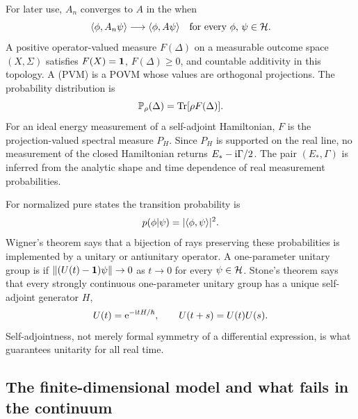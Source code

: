 For later use, $A_n$ converges to $A$ in the 
when
\begin{equation}
  \langle \phi,A_n\psi\rangle\longrightarrow
  \langle \phi,A\psi\rangle
  \quad\text{for every $\phi$, $\psi\in\mathcal{H}$} .
  \label{eq:wot-first-definition}
\end{equation}
A positive operator-valued measure $F(\Delta)$ on a measurable outcome space
$(X,\Sigma)$ satisfies $F(X)=\mathbf{1}$, $F(\Delta)\geq0$, and countable
additivity in this topology.  A  (PVM) is a
POVM whose values are orthogonal projections.  The probability distribution
is
\begin{equation}
  \mathbb P_\rho(\Delta)=\operatorname{Tr}[\rho F(\Delta)].
  \label{eq:povm-probability}
\end{equation}
For an ideal energy measurement of a self-adjoint Hamiltonian, $F$ is the
projection-valued spectral measure $P_H$.  Since $P_H$ is supported on the
real line, no measurement of the closed Hamiltonian returns
$E_* -\mathrm{i}\Gamma/2$.  The pair $(E_*,\Gamma)$ is inferred from the analytic
shape and time dependence of real measurement probabilities.

For normalized pure states the transition probability is
\begin{equation}
  p(\phi|\psi)=|\langle \phi,\psi\rangle|^2.
  \label{eq:transition-probability}
\end{equation}
Wigner's theorem says that a bijection of rays preserving these probabilities
is implemented by a unitary or antiunitary operator.  A one-parameter unitary
group is  if
$\|(U(t)-\mathbf{1})\psi\|\to0$ as $t\to0$ for every $\psi\in\mathcal{H}$.
Stone's theorem says that every strongly continuous one-parameter unitary
group has a unique self-adjoint generator $H$,
\begin{equation}
  U(t)=\mathrm{e}^{-\mathrm{i} tH/\hbar},
  \qquad U(t+s)=U(t)U(s).
  \label{eq:stone-evolution}
\end{equation}
Self-adjointness, not merely formal symmetry of a differential expression,
is what guarantees unitarity for all real time.

\subsection{The finite-dimensional model and what fails in the continuum}
\label{subsec:finite-to-continuum}

